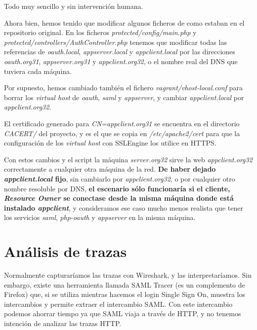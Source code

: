 \documentclass[]{article}
\begin{document}
Todo muy sencillo y sin intervención humana.


\hfill


Ahora bien, hemos tenido que modificar algunos ficheros de como estaban en el repositorio original. En los ficheros \textit{protected/config/main.php} y \textit{protected/controllers/AuthController.php} tenemos que modificar todas las referencias de \textit{oauth.local}, \textit{appserver.local} y \textit{appclient.local} por las direcciones \textit{oauth.org31}, \textit{appserver.org31} y \textit{appclient.org32}, o el nombre real del DNS que tuviera cada máquina.

Por supuesto, hemos cambiado también el fichero \textit{vagrant/vhost-local.conf} para borrar los \textit{virtual host} de \textit{oauth}, \textit{saml} y \textit{appserver}, y cambiar \textit{appclient.local} por \textit{appclient.org32}.

\hfill

El certificado generado para \textit{CN=appclient.org31} se encuentra en el directorio \textit{CACERT/} del proyecto, y es el que se copia en \textit{/etc/apache2/cert} para que la configuración de los \textit{virtual host} con SSLEngine los utilice en HTTPS.



\hfill


Con estos cambios y el script la máquina \textit{server.org32} sirve la web \textit{appclient.org32} correctamente a cualquier otra máquina de la red. \textbf{De haber dejado \textit{appclient.local} fijo}, sin cambiarlo por \textit{appclient.org32}, o por cualquier otro nombre resoluble por DNS, \textbf{el escenario sólo funcionaría si el cliente, \textit{Resource Owner} se conectase desde la misma máquina donde está instalado \textit{appclient}}, y consideramos ese caso mucho menos realista que tener los servicios \textit{saml}, \textit{php-oauth} y \textit{appserver} en la misma máquina.



\section{Análisis de trazas}

Normalmente capturaríamos las trazas con Wireshark, y las interpretaríamos. Sin embargo, existe una herramienta llamada SAML Tracer (es un complemento de Firefox) que, si se utiliza mientras hacemos el login Single Sign On, muestra los intercambios y permite extraer el intercambio SAML. Con este intercambio podemos ahorrar tiempo ya que SAML viaja a través de HTTP, y no tenemos intención de analizar las trazas HTTP.
\end{document}
